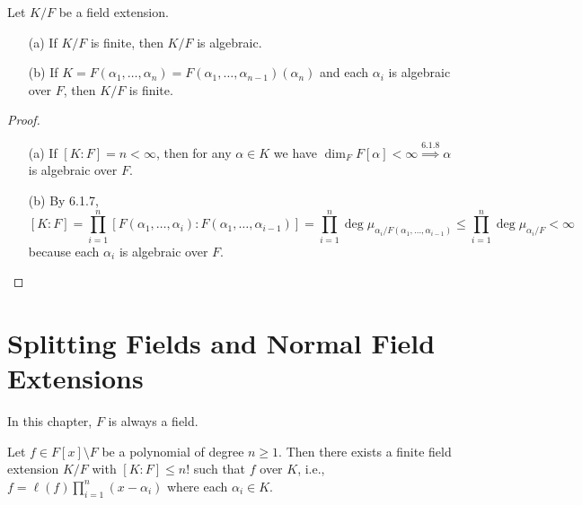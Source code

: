 \documentclass[11pt]{book}
\theoremstyle{definition}   \newtheorem{defn}[counter]{Definition} %
\newcommand{\bs}{\setminus}   \newcommand{\A}{\mathcal{A}}   \newcommand{\sy}{\textnormal{Syl}}   \newcommand{\size}[1]{\left| #1 \right|}
\newcommand{\vs}{\vspace{8pt}}   \newcommand{\hs}{\hspace{8pt}}
\numberwithin{counter}{chapter}
\begin{document}
\vs

\begin{lemma}
Let $K/F$ be a field extension. 
\begin{enumerate}
\item[(a)] If $K/F$ is finite, then $K/F$ is algebraic. 
\item[(b)] If $K = F(\alpha_1,\dots,\alpha_n) = F(\alpha_1,\dots,\alpha_{n-1})(\alpha_n)$ and each $\alpha_i$ is algebraic over $F$, then $K/F$ is finite.
\end{enumerate}
\end{lemma}

\begin{proof} \
\begin{enumerate}
\item[(a)] If $[K : F] = n < \infty$, then for any $\alpha \in K$ we have $\dim_F F[\alpha] < \infty \overset{6.1.8}{\implies} \alpha$ is algebraic over $F$. 
\item[(b)] By 6.1.7, 
	\[[K : F] = \prod_{i=1}^n [F(\alpha_1,\dots,\alpha_i) : F(\alpha_1,\dots,\alpha_{i-1})] = \prod_{i=1}^n \deg \mu_{\alpha_i/F(\alpha_1,\dots,\alpha_{i-1})} \leq \prod_{i=1}^n \deg \mu_{\alpha_i/F} < \infty \]
because each $\alpha_i$ is algebraic over $F$.
\end{enumerate}
\end{proof}

\vs

\chapter{Splitting Fields and Normal Field Extensions}



In this chapter, $F$ is always a field. 

\vs

\begin{lemma}
Let $f \in F[x] \bs F$ be a polynomial of degree $n \geq 1$. Then there exists a finite field extension $K/F$ with $[K : F] \leq n!$ such that $f$  over $K$, i.e., $f = \ell(f) \prod_{i=1}^n (x-\alpha_i)$ where each $\alpha_i \in K$. 
\end{lemma}
\end{document}
